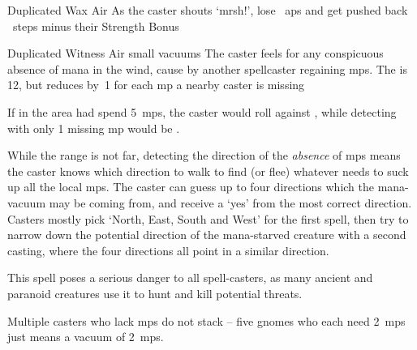 \ifodd\value{diceNo}

  {Duplicated}%
  {Wax}%
  {Air}%
  {}%
  {As the caster shouts `mrsh!',  lose ~\glspl{ap} and get pushed back ~\glspl{step} minus their Strength Bonus}%
  {}

\else

  {Duplicated}%
  {Witness}%
  {Air}%
  {small vacuums}%
  {The caster feels for any conspicuous absence of mana in the wind, cause by another spellcaster regaining \glspl{mp}.
  The  is 12, but reduces by~1 for each \gls{mp} a nearby caster is missing}%
  {If  in the \gls{area} had spend 5~\glspl{mp}, the caster would roll against \tn[7], while detecting  with only 1 missing \gls{mp} would be \tn[11].

  While the range is not far, detecting the direction of the \emph{absence} of \glspl{mp} means the caster knows which direction to walk to find (or flee) whatever needs to suck up all the local \glspl{mp}.
  The caster can guess up to four directions which the mana-vacuum may be coming from, and receive a `yes' from the most correct direction.
  Casters mostly pick `North, East, South and West' for the first spell, then try to narrow down the potential direction of the mana-starved creature with a second casting, where the four directions all point in a similar direction.

  This spell poses a serious danger to all spell-casters, as many ancient and paranoid creatures use it to hunt and kill potential threats.

  Multiple casters who lack \glspl{mp} do not stack -- five gnomes who each need 2~\glspl{mp} just means a vacuum of 2~\glspl{mp}.}

\fi
{}
